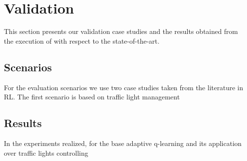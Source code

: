 
\section{Validation}
\label{sec:validation}

This section presents our validation case studies and the results obtained from the execution of \adaptiverl with respect to the state-of-the-art.

\subsection{Scenarios}

For the evaluation scenarios we use two case studies taken from the literature in \ac{RL}. The first scenario is based on traffic light management~\cite{} 

\subsection{Results}

In the experiments realized, for the base adaptive q-learning and its application over traffic lights controlling 



\endinput


